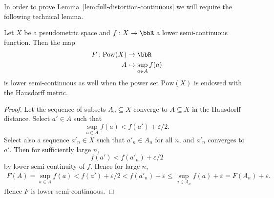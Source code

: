\documentclass[twoside,11pt]{article}
\newcommand{\pow}{\mathrm{Pow}}%
\renewcommand{\epsilon}{\varepsilon}
\begin{document}
In order to prove Lemma~\ref{lem:full-distortion-continuous}    we will require the following technical lemma.
        \begin{lemma}\label{lem:lower-semi-continuous-sup}
            Let $X$ be a pseudometric space and $f:X\to \bbR$ a lower semi-continuous function. Then the map
            \begin{align*}
                F:\pow(X) & \to \bbR\\
                A &\mapsto \sup_{a\in A} f(a)
            \end{align*}
            is lower semi-continuous as well when the power set $\pow(X)$ is endowed with the Hausdorff metric.
        \end{lemma}
        \begin{proof}
        Let the sequence of subsets $A_n\subseteq X$ converge to $A\subseteq X$ in the Hausdorff distance. Select $a' \in A$ such that
        \[\sup_{a\in A} f(a) < f(a') + \epsilon/2.\]
        Select also a sequence $a'_n \in X$ such that $a'_n \in A_n$ for all $n$, and $a'_n$ converges to $a'$. Then for sufficiently large $n$,
        \[f(a') < f(a'_n)+\epsilon/2\]
        by lower semi-continuity of $f$. Hence for large $n$,
        \begin{align*}
            F(A) = \sup_{a\in A} f(a) < f(a')+\epsilon/2 < f(a'_n) + \epsilon \leq \sup_{a\in A_n} f(a) + \epsilon = F(A_n) + \epsilon.
        \end{align*}
        Hence $F$ is lower semi-continuous.
        \end{proof}
\end{document}
